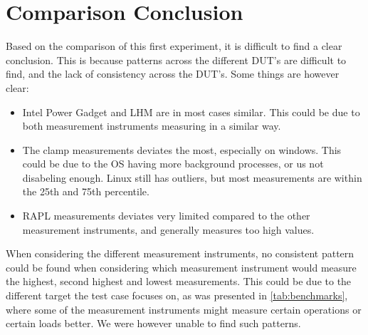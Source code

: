 \section{Comparison Conclusion}

Based on the comparison of this first experiment, it is difficult to find a clear conclusion. This is because patterns across the different DUT's are difficult to find, and the lack of consistency across the DUT's. Some things are however clear:

\begin{itemize}
    \item Intel Power Gadget and LHM are in most cases similar. This could be due to both measurement instruments measuring in a similar way.
    \item The clamp measurements deviates the most, especially on windows. This could be due to the OS having more background processes, or us not disabeling enough. Linux still has outliers, but most measurements are within the 25th and 75th percentile.
    \item RAPL measurements deviates very limited compared to the other measurement instruments, and generally measures too high values.
\end{itemize}

When considering the different measurement instruments, no consistent pattern could be found when considering which measurement instrument would measure the highest, second highest and lowest measurements. This could be due to the different target the test case focuses on, as was presented in \cref{tab:benchmarks}, where some of the measurement instruments might measure certain operations or certain loads better. We were however unable to find such patterns.

